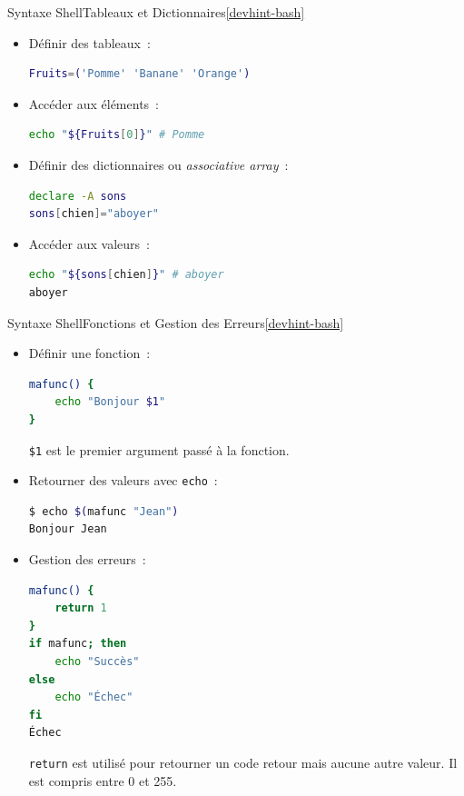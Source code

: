 \documentclass{beamer}
\begin{document}
    \begin{frame}[fragile]{Syntaxe Shell}{Tableaux et Dictionnaires\cref{devhint-bash}}
        \begin{itemize}
            \item Définir des tableaux~:
            \begin{lstlisting}[language=bash]
Fruits=('Pomme' 'Banane' 'Orange')
            \end{lstlisting}
            \item Accéder aux éléments~:
            \begin{lstlisting}[language=bash]
echo "${Fruits[0]}" # Pomme
            \end{lstlisting}
            \item Définir des dictionnaires ou \textit{associative array}~:
            \begin{lstlisting}[language=bash]
declare -A sons
sons[chien]="aboyer"
            \end{lstlisting}
            \item Accéder aux valeurs~:
            \begin{lstlisting}[language=bash]
echo "${sons[chien]}" # aboyer
aboyer
            \end{lstlisting}
        \end{itemize}
    \end{frame}

    \begin{frame}[fragile]{Syntaxe Shell}{Fonctions et Gestion des Erreurs\cref{devhint-bash}}
        \begin{itemize}
            \item Définir une fonction~:
            \begin{lstlisting}[language=bash,basicstyle=\ttfamily\tiny]
mafunc() {
    echo "Bonjour $1"
}
            \end{lstlisting}
            \lstinline{$1} est le premier argument passé à la fonction.
            \item Retourner des valeurs avec \lstinline{echo}~:
            \begin{lstlisting}[language=bash,basicstyle=\ttfamily\tiny]
$ echo $(mafunc "Jean")
Bonjour Jean
            \end{lstlisting}
            \item Gestion des erreurs~:
            \begin{lstlisting}[language=bash,basicstyle=\ttfamily\tiny]
mafunc() {
    return 1
}
if mafunc; then
    echo "Succès"
else
    echo "Échec"
fi
Échec
            \end{lstlisting}
            \lstinline{return} est utilisé pour retourner un code retour mais aucune autre valeur.
            Il est compris entre 0 et 255.
        \end{itemize}
    \end{frame}
\end{document}
